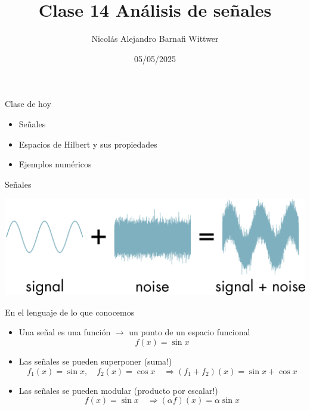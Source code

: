 \documentclass[12pt,aspectratio=169,xcolor=dvipsnames]{beamer}
\title[short title]{Clase 14 Análisis de señales}
\subtitle{}
\author[NA Barnafi] {Nicolás Alejandro Barnafi Wittwer}
\institute[UC|CMM] 
{
    Pontificia Universidad Católica de Chile \\
    Centro de Modelamiento Matemático
}
\date{05/05/2025}
\begin{document}
\begin{frame}
    \maketitle
\end{frame}
\begin{frame}{Clase de hoy}
    \begin{itemize}
        \item Señales
        \item Espacios de Hilbert y sus propiedades
        \item Ejemplos numéricos
    \end{itemize}

    \vspace{1cm}
\end{frame}
\begin{frame}{Señales}
    \begin{center}
        \includegraphics[width=\textwidth]{../images/s2n.png}
    \end{center}
\end{frame}
\begin{frame}{En el lenguaje de lo que conocemos}
    \begin{itemize}
        \item<+-> Una señal es una función $\to$ un punto de un espacio funcional
            $$ f(x) = \sin x $$
        \item<+-> Las señales se pueden superponer (suma!)
            $$ f_1(x)=\sin x, \quad f_2(x) = \cos x \quad \Rightarrow (f_1+f_2)(x) = \sin x + \cos x$$
        \item<+-> Las señales se pueden modular (producto por escalar!)
            $$ f(x) = \sin x \quad \Rightarrow (\alpha f)(x) = \alpha \sin x $$
    \end{itemize}
\end{frame}
\end{document}

